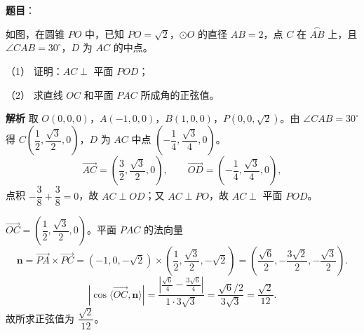 \begin{answer}

\textbf{题目}：

如图，在圆锥 $PO$ 中，已知 $PO=\sqrt2$，$\odot O$ 的直径 $AB=2$，点 $C$ 在 $\overset{\frown}{AB}$ 上，且 $\angle CAB=30^\circ$，$D$ 为 $AC$ 的中点。

（1） 证明：$AC\perp$ 平面 $POD$；

（2） 求直线 $OC$ 和平面 $PAC$ 所成角的正弦值。
\nopagebreak[4]
\begin{center}\end{center}
\nopagebreak[4]
\textbf{解析}
取 $O(0,0,0)$，$A(-1,0,0)$，$B(1,0,0)$，$P(0,0,\sqrt2)$。由 $\angle CAB=30^\circ$ 得 $C\left(\dfrac12,\dfrac{\sqrt3}2,0\right)$，$D$ 为 $AC$ 中点 $\left(-\dfrac14,\dfrac{\sqrt3}4,0\right)$。
\nopagebreak[4]
\[\overrightarrow{AC}=\left(\frac32,\frac{\sqrt3}2,0\right),\qquad \overrightarrow{OD}=\left(-\frac14,\frac{\sqrt3}4,0\right),\]
点积 $-\dfrac38+\dfrac38=0$，故 $AC\perp OD$；又 $AC\perp PO$，故 $AC\perp$ 平面 $POD$。

$\overrightarrow{OC}=\left(\dfrac12,\dfrac{\sqrt3}2,0\right)$。平面 $PAC$ 的法向量
\nopagebreak[4]
\[\boldsymbol n=\overrightarrow{PA}\times\overrightarrow{PC}=(-1,0,-\sqrt2)\times\left(\frac12,\frac{\sqrt3}2,-\sqrt2\right)
=\left(\frac{\sqrt6}2,-\frac{3\sqrt2}2,-\frac{\sqrt3}2\right).\]
\nopagebreak[4]
\[|\cos\langle\overrightarrow{OC},\boldsymbol n\rangle|=\frac{\left|\frac{\sqrt6}4-\frac{3\sqrt6}4\right|}{1\cdot3\sqrt3}
=\frac{\sqrt6/2}{3\sqrt3}=\frac{\sqrt2}{12}.\]
故所求正弦值为 $\dfrac{\sqrt2}{12}$。



\end{answer}
